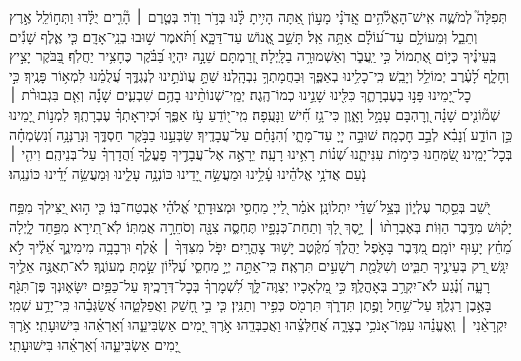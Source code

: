 \documentclass[twoside, openany, parskip=half, 11pt]{book}
\begin{document}
\begin{narrow}
תְּפִלָּה֮ לְמֹשֶׁ֢ה אִֽישׁ־הָאֱלֹ֫הִ֥ים
אֲֽדֹנָ֗י מָע֣וֹן אַ֭תָּה הָיִ֥יתָ לָּ֗נוּ בְּדֹ֣ר וָדֹֽר׃
בְּטֶ֤רֶם ׀ הָ֘רִ֤ים יֻלָּ֗דוּ וַתְּח֣וֹלֵֽל אֶ֣רֶץ וְתֵבֵ֑ל וּֽמֵעוֹלָ֥ם עַד־ע֝וֹלָ֗ם אַתָּ֥ה אֵֽל׃
תָּשֵׁ֣ב אֱ֭נוֹשׁ עַד־דַּכָּ֑א וַ֝תֹּ֗אמֶר שׁ֣וּבוּ בְנֵֽי־אָדָֽם׃
כִּ֤י אֶ֪לֶף שָׁנִ֡ים בְּֽעֵינֶ֗יךָ כְּי֣וֹם אֶ֭תְמוֹל כִּ֣י יַֽעֲבֹ֑ר וְאַשְׁמוּרָ֥ה בַלָּֽיְלָה׃
זְ֭רַמְתָּם שֵׁנָ֣ה יִהְי֑וּ בַּ֝בֹּ֗קֶר כֶּחָצִ֥יר יַחֲלֹֽף׃
בַּ֭בֹּקֶר יָצִ֣יץ וְחָלָ֑ף לָ֝עֶ֗רֶב יְמוֹלֵ֥ל וְיָבֵֽשׁ׃
כִּֽי־כָלִ֥ינוּ בְאַפֶּ֑ךָ וּֽבַחֲמָתְךָ֥ נִבְהָֽלְנוּ׃
שַׁתָּ֣ עֲוֺנֹתֵ֣ינוּ לְנֶגְדֶּ֑ךָ עֲ֝לֻמֵ֗נוּ לִמְא֥וֹר פָּנֶֽיךָ׃
כִּ֣י כׇל־יָ֭מֵינוּ פָּנ֣וּ בְעֶבְרָתֶ֑ךָ כִּלִּ֖ינוּ שָׁנֵ֣ינוּ כְמוֹ־הֶֽגֶה׃
יְמֵֽי־שְׁנוֹתֵ֨ינוּ בָהֶ֥ם שִׁבְעִ֪ים שָׁנָ֡ה וְאִ֤ם בִּגְבוּרֹ֨ת ׀ שְׁמ֘וֹנִ֤ים שָׁנָ֗ה וְ֭רׇהְבָּם עָמָ֣ל וָאָ֑וֶן כִּי־גָ֥ז חִ֗֝ישׁ וַנָּעֻֽפָה׃
מִֽי־י֭וֹדֵעַ עֹ֣ז אַפֶּ֑ךָ וּ֝כְיִרְאָתְךָ֗ עֶבְרָתֶֽךָ׃
לִמְנ֣וֹת יָ֭מֵינוּ כֵּ֣ן הוֹדַ֑ע וְ֝נָבִ֗א לְבַ֣ב חׇכְמָֽה׃
שׁוּבָ֣ה יְיָ֭ עַד־מָתָ֑י וְ֝הִנָּחֵ֗ם עַל־עֲבָדֶֽיךָ׃
שַׂבְּעֵ֣נוּ בַבֹּ֣קֶר חַסְדֶּ֑ךָ וּֽנְרַנְּנָ֥ה וְ֝נִשְׂמְחָ֗ה בְּכׇל־יָמֵֽינוּ׃
שַׂ֭מְּחֵנוּ כִּימ֣וֹת עִנִּיתָ֑נוּ שְׁ֝נ֗וֹת רָאִ֥ינוּ רָעָֽה׃
יֵרָאֶ֣ה אֶל־עֲבָדֶ֣יךָ פׇעֳלֶ֑ךָ וַ֝הֲדָרְךָ֗ עַל־בְּנֵיהֶֽם׃
וִיהִ֤י ׀ נֹ֤עַם אֲדֹנָ֥י אֱלֹהֵ֗ינוּ עָ֫לֵ֥ינוּ וּמַעֲשֵׂ֣ה יָ֭דֵינוּ כּוֹנְנָ֥ה עָלֵ֑ינוּ וּֽמַעֲשֵׂ֥ה יָ֝דֵ֗ינוּ כּוֹנְנֵֽהוּ׃


יֹ֭שֵׁב בְּסֵ֣תֶר עֶלְי֑וֹן בְּצֵ֥ל שַׁ֝דַּ֗י יִתְלוֹנָֽן׃
אֹמַ֗ר לַ֭ייָ מַחְסִ֣י וּמְצוּדָתִ֑י אֱ֝לֹהַ֗י אֶבְטַח־בּֽוֹ׃
כִּ֤י ה֣וּא יַ֭צִּילְךָ מִפַּ֥ח יָק֗וּשׁ מִדֶּ֥בֶר הַוּֽוֹת׃
בְּאֶבְרָת֨וֹ ׀ יָ֣סֶךְ לָ֭ךְ וְתַחַת־כְּנָפָ֣יו תֶּחְסֶ֑ה צִנָּ֖ה וְסֹחֵרָ֣ה אֲמִתּֽוֹ׃
לֹֽא־תִ֭ירָא מִפַּ֣חַד לָ֑יְלָה מֵ֝חֵ֗ץ יָע֥וּף יוֹמָֽם׃
מִ֭דֶּבֶר בָּאֹ֣פֶל יַהֲלֹ֑ךְ מִ֝קֶּ֗טֶב יָשׁ֥וּד צׇהֳרָֽיִם׃
יִפֹּ֤ל מִצִּדְּךָ֨ ׀ אֶ֗לֶף וּרְבָבָ֥ה מִימִינֶ֑ךָ אֵ֝לֶ֗יךָ לֹ֣א יִגָּֽשׁ׃
רַ֭ק בְּעֵינֶ֣יךָ תַבִּ֑יט וְשִׁלֻּמַ֖ת רְשָׁעִ֣ים תִּרְאֶֽה׃
כִּֽי־אַתָּ֣ה יְיָ֣ מַחְסִ֑י עֶ֝לְי֗וֹן שַׂ֣מְתָּ מְעוֹנֶֽךָ׃
לֹא־תְאֻנֶּ֣ה אֵלֶ֣יךָ רָעָ֑ה וְ֝נֶ֗גַע לֹא־יִקְרַ֥ב בְּאׇהֳלֶֽךָ׃
כִּ֣י מַ֭לְאָכָיו יְצַוֶּה־לָּ֑ךְ לִ֝שְׁמׇרְךָ֗ בְּכׇל־דְּרָכֶֽיךָ׃
עַל־כַּפַּ֥יִם יִשָּׂא֑וּנְךָ פֶּן־תִּגֹּ֖ף בָּאֶ֣בֶן רַגְלֶֽךָ׃
עַל־שַׁ֣חַל וָפֶ֣תֶן תִּדְרֹ֑ךְ תִּרְמֹ֖ס כְּפִ֣יר וְתַנִּֽין׃
כִּ֤י בִ֣י חָ֭שַׁק וַאֲפַלְּטֵ֑הוּ אֲ֝שַׂגְּבֵ֗הוּ כִּֽי־יָדַ֥ע שְׁמִֽי׃
יִקְרָאֵ֨נִי ׀ וְֽאֶעֱנֵ֗הוּ עִמּֽוֹ־אָנֹכִ֥י בְצָרָ֑ה אֲ֝חַלְּצֵ֗הוּ וַאֲכַבְּדֵֽהוּ׃
אֹ֣רֶךְ יָ֭מִים אַשְׂבִּיעֵ֑הוּ וְ֝אַרְאֵ֗הוּ בִּישׁוּעָתִֽי׃
\scriptsize{אֹ֣רֶךְ יָ֭מִים אַשְׂבִּיעֵ֑הוּ וְ֝אַרְאֵ֗הוּ בִּישׁוּעָתִֽי׃ }
\normalsize{}


\end{narrow}
\end{document}
